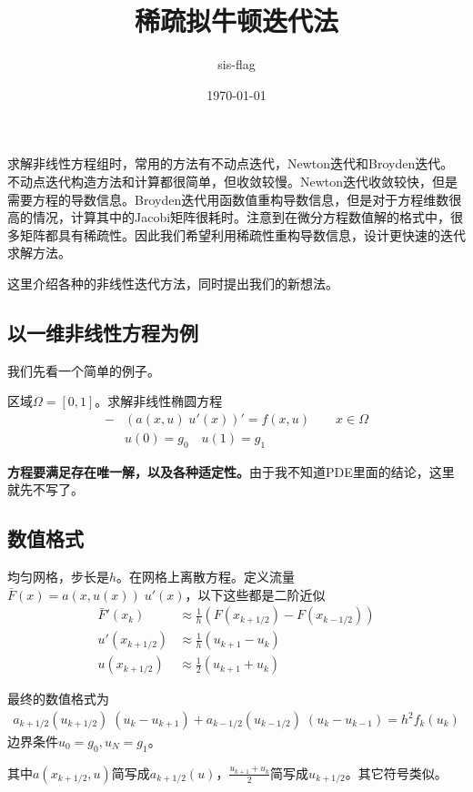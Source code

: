 \documentclass[12pt,a4paper]{article}
\title{稀疏拟牛顿迭代法}
\author{sis-flag}
\date{\today}
\begin{document}
\maketitle

求解非线性方程组时，常用的方法有不动点迭代，Newton迭代和Broyden迭代。不动点迭代构造方法和计算都很简单，但收敛较慢。Newton迭代收敛较快，但是需要方程的导数信息。Broyden迭代用函数值重构导数信息，但是对于方程维数很高的情况，计算其中的Jacobi矩阵很耗时。注意到在微分方程数值解的格式中，很多矩阵都具有稀疏性。因此我们希望利用稀疏性重构导数信息，设计更快速的迭代求解方法。

这里介绍各种的非线性迭代方法，同时提出我们的新想法。

\subsection*{以一维非线性方程为例}

我们先看一个简单的例子。

区域$\Omega = [0, 1]$。求解非线性椭圆方程
\begin{align*}
- & (a(x, u) \; u'(x))' = f(x, u) \qquad x \in \Omega \\
& u(0) = g_0 \quad u(1) = g_1
\end{align*}

\textbf{方程要满足存在唯一解，以及各种适定性。}由于我不知道PDE里面的结论，这里就先不写了。

\subsection*{数值格式}

均匀网格，步长是$h$。在网格上离散方程。定义流量$\bar{F}(x) = a(x, u(x)) \; u'(x)$，以下这些都是二阶近似
\begin{align*}
\bar{F}'(x_{k}) & \approx \frac{1}{h} (F(x_{k+1/2}) - F(x_{k-1/2})) \\
u'(x_{k+1/2}) & \approx \frac{1}{h} (u_{k+1} - u_{k}) \\
u(x_{k+1/2}) & \approx \frac{1}{2} (u_{k+1} + u_{k})
\end{align*}

最终的数值格式为
\begin{align*}
a_{k+1/2}(u_{k+1/2}) \; (u_{k} - u_{k+1}) + a_{k-1/2}(u_{k-1/2}) \; (u_{k} - u_{k-1}) = h^2 f_{k}(u_{k})
\end{align*}
边界条件$u_0 = g_0, u_N = g_1$。

其中$a(x_{k+1/2}, u)$简写成$a_{k+1/2}(u)$，$\frac{u_{k+1} + u_{k}}{2}$简写成$u_{k+1/2}$。其它符号类似。
\end{document}
